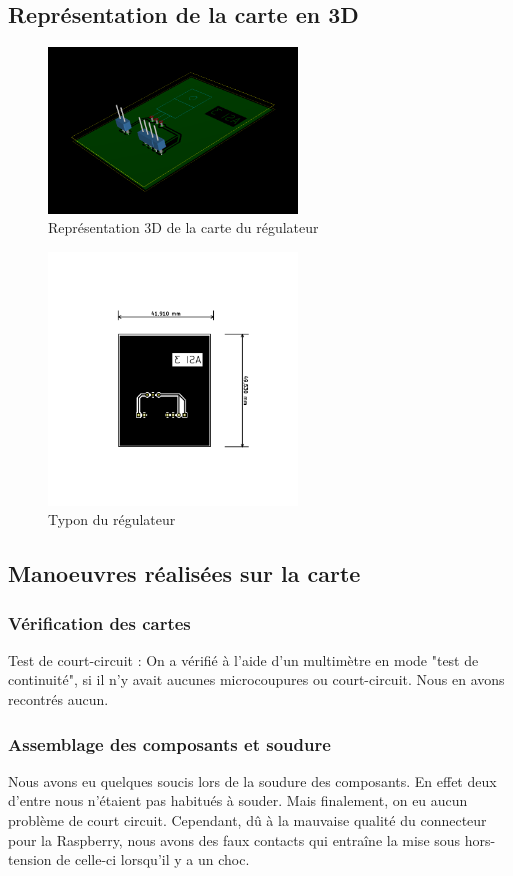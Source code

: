\subsection{Représentation de la carte en 3D}
\begin{figure}[h]
	\centering
	\includegraphics[width=250px]{images/3DReg.png}
	\caption{Représentation 3D de la carte du régulateur}
\end{figure}
\begin{figure}[h]
	\centering
	\includegraphics[width=250px]{images/typonReg.png}
	\caption{Typon du régulateur}
\end{figure}

\subsection{Manoeuvres réalisées sur la carte}
	\subsubsection{Vérification des cartes}
		Test de court-circuit : On a vérifié à l'aide d'un multimètre en mode "test de continuité", si il n'y avait aucunes microcoupures ou court-circuit. Nous en avons recontrés aucun.
	\subsubsection{Assemblage des composants et soudure}
	Nous avons eu quelques soucis lors de la soudure des composants. En effet deux d'entre nous n'étaient pas habitués à souder. Mais finalement, on eu aucun problème de court circuit. Cependant, dû à la mauvaise qualité du connecteur pour la Raspberry, nous avons des faux contacts qui entraîne la mise sous hors-tension de celle-ci lorsqu'il y a un choc.
